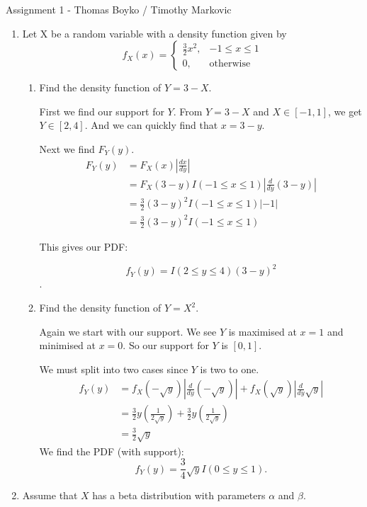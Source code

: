 \documentclass{article}
\begin{document}
    \huge Assignment 1 - Thomas Boyko / Timothy Markovic
    \normalsize
\begin{enumerate} 

    \item Let X be a random variable with a density function given by
    \[f_X (x) =
    \begin{cases}
        \frac{3}{2}x^2,& -1\le x\le 1\\ 
        0, & \text{otherwise}
    \end{cases}\] 
    \begin{enumerate}[label= (\alph*)] 
        \item Find the density function of $Y = 3 - X$. 

            First we find our support for $Y$. From $Y=3-X$ and $X\in [-1,1]$, we get
            $Y\in [2,4]$. And we can quickly find that $x=3-y$.

            Next we find $F_Y(y)$.
            \begin{align*}
                F_Y(y)&= F_X(x)\left| \frac{dx}{dy} \right| \\
                &= F_X(3-y)I(-1\leq x\leq 1)\left| \frac{d}{dy}(3-y) \right| \\
                &= \frac{3}{2}(3-y)^2I(-1\leq x\leq 1)\left| -1 \right|  \\
                &= \frac{3}{2}(3-y)^2I(-1\leq x\leq 1)
            \end{align*}
            
                This gives our PDF:

            \[f_Y(y)=I(2\leq y\leq 4)(3-y)^2\].

        \item Find the density function of $Y = X^{2}$. 

            Again we start with our support. We see $Y$ is maximised at $x=1$ and minimised at 
            $x=0$. So our support for $Y$ is $[0,1]$.

            We must split into two cases since $Y$ is two to one. 
            \begin{align*}
                f_Y(y)&=f_X(-\sqrt{y} )\left| \frac{d}{dy}(-\sqrt{y})  \right| +f_X(\sqrt{y} )\left| \frac{d}{dy}\sqrt{y}  \right| \\
                &= \frac{3}{2}y(\frac{1}{2\sqrt{y} })+\frac{3}{2}y(\frac{1}{2\sqrt{y} } ) \\
                &=\frac{3}{2}\sqrt{y} 
            \end{align*}
            We find the PDF (with support):
            \[
            f_Y(y)
            =\frac{3}{4}\sqrt{y} I(0\leq y\leq 1)
            .\] 
    \end{enumerate}
\item Assume that $X$ has a beta distribution with parameters $\alpha$ and $\beta$.


\end{enumerate}
\end{document}
